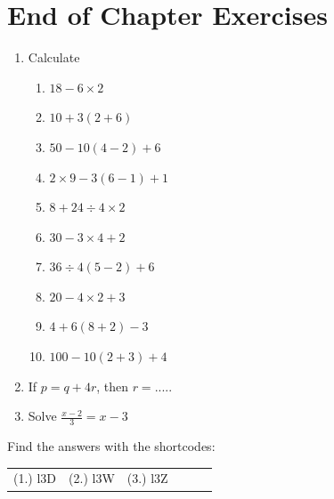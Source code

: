     \section{End of Chapter Exercises}
            \nopagebreak
      \label{m38346*id180660}\begin{enumerate}[noitemsep, label=\textbf{\arabic*}. ] 
            \label{m38346*uid81}\item Calculate
\label{m38346*id180675}\begin{enumerate}[noitemsep, label=\textbf{\alph*}. ] 
            \label{m38346*uid82}\item $18-6\ensuremath{\times}2$\label{m38346*uid83}\item $10+3\left(2+6\right)$\label{m38346*uid84}\item $50-10\left(4-2\right)+6$\label{m38346*uid85}\item $2\ensuremath{\times}9-3\left(6-1\right)+1$\label{m38346*uid86}\item $8+24÷4\ensuremath{\times}2$\label{m38346*uid87}\item $30-3\ensuremath{\times}4+2$\label{m38346*uid88}\item $36÷4\left(5-2\right)+6$\label{m38346*uid89}\item $20-4\ensuremath{\times}2+3$\label{m38346*uid90}\item $4+6\left(8+2\right)-3$\label{m38346*uid91}\item $100-10\left(2+3\right)+4$\end{enumerate}
        \hspace{1ex}        \label{m38346*uid92}\item If $p=q+4r$, then $r=.....$\hspace{1ex}        \label{m38346*uid93}\item Solve $\frac{x-2}{3}=x-3$\hspace{1ex}        \end{enumerate}
  \label{m38346**end}
\par {} Find the answers with the shortcodes:
 \par \begin{tabular}[h]{cccccc}
 (1.) l3D  &  (2.) l3W  &  (3.) l3Z  & \end{tabular}
